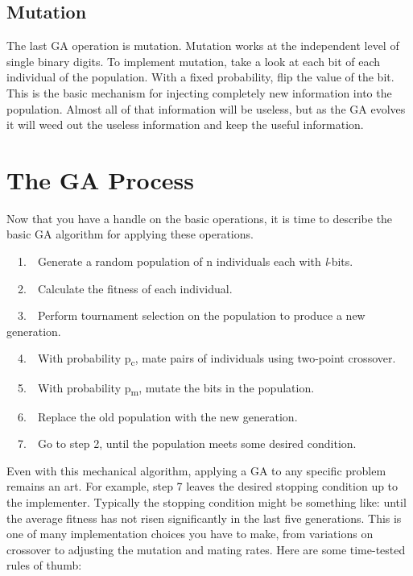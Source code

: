 
\subsection*{Mutation}

The last GA operation is mutation. Mutation works at the independent
level of single binary digits. To implement mutation, take a look at
each bit of each individual of the population. With a fixed
probability, flip the value of the bit. This is the basic mechanism for
injecting completely new information into the population. Almost all of
that information will be useless, but as the GA evolves it will weed
out the useless information and keep the useful information. 

\section{The GA Process}

Now that you have a handle on the basic operations, it is time to
describe the basic GA algorithm for applying these operations. 

\ \ 1.\ \ Generate a random population of n individuals each with
\textit{l}{}-bits.

\ \ 2.\ \ Calculate the fitness of each individual.

\ \ 3.\ \ Perform tournament selection on the population to produce a
new generation.

\ \ 4.\ \ With probability p\textsubscript{c}, mate pairs of individuals
using two-point crossover.

\ \ 5.\ \ With probability p\textsubscript{m}, mutate the bits in the
population.

\ \ 6.\ \ Replace the old population with the new generation.

\ \ 7.\ \ Go to step 2, until the population meets some desired
condition.

Even with this mechanical algorithm, applying a GA to any specific
problem remains an art. For example, step 7 leaves the desired
stopping condition up to the implementer. Typically the stopping
condition might be something like: until the average fitness has not
risen significantly in the last five generations. This is one of
many implementation choices you have to make,
from variations on crossover to adjusting the
mutation and mating rates. Here are some time-tested rules of thumb:

